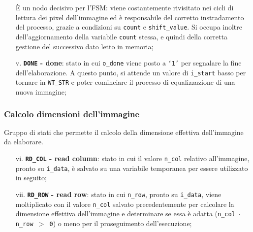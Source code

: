 \documentclass{article}
\begin{document}
\begin{itemize}
          È un nodo decisivo per l’FSM: viene costantemente rivisitato nei cicli di lettura dei pixel dell’immagine ed è responsabile del corretto instradamento del processo, grazie a condizioni su \texttt{count} e \texttt{shift\_value}. Si occupa inoltre dell’aggiornamento della variabile \texttt{count} stessa, e quindi della corretta gestione del successivo dato letto in memoria;
    \item [v.]      \textbf{\texttt{DONE} - done}: stato in cui \texttt{o\_done} viene posto a \texttt{‘1’} per segnalare la fine dell’elaborazione. A questo punto, si attende un valore di \texttt{i\_start} basso per tornare in \texttt{WT\_STR} e poter cominciare il processo di equalizzazione di una nuova immagine;
\end{itemize}

\subsubsection{Calcolo dimensioni dell'immagine} %
Gruppo di stati che permette il calcolo della dimensione effettiva dell’immagine da elaborare.
\begin{itemize}
    \item [vi.]     \textbf{\texttt{RD\_COL} - read column}: stato in cui il valore \texttt{n\_col} relativo all’immagine, pronto su \texttt{i\_data}, è salvato su una variabile temporanea per essere utilizzato in seguito;
    \item [vii.]    \textbf{\texttt{RD\_ROW} - read row}: stato in cui \texttt{n\_row}, pronto su \texttt{i\_data}, viene moltiplicato con il valore \texttt{n\_col} salvato precedentemente per calcolare la dimensione effettiva dell’immagine e determinare se essa è adatta (\texttt{n\_col $\cdot$ n\_row $>$ 0}) o meno per il proseguimento dell’esecuzione;
\end{itemize}
\end{document}
